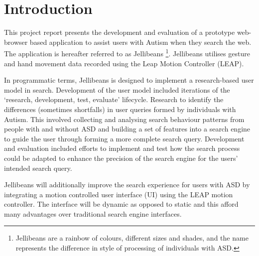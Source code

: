 \documentclass[a4paper, 11pt]{article}
\begin{document}
\section{Introduction}\label{intro}

This project report presents the development and evaluation of a prototype web-browser based application to assist users with Autism when they search the web. The application is hereafter referred to as Jellibeans \footnote{Jellibeans are a rainbow of colours, different sizes and shades, and the name represents the difference in style of processing of individuals with ASD.}. Jellibeans utilises gesture and hand movement data recorded using the Leap Motion Controller (LEAP). 


In programmatic terms, Jellibeans is designed to implement a research-based user model in search. Development of the user model included iterations of the `research, development, test, evaluate' lifecycle. Research to identify the differences (sometimes shortfalls) in user queries formed by individuals with Autism. This involved collecting and analysing search behaviour patterns from people with and without ASD and building a set of features into a search engine to guide the user through forming a more complete search query. Development and evaluation included efforts to implement and test how the search process could be adapted to enhance the precision of the search engine for the users' intended search query. 


Jellibeans will additionally improve the search experience for users with ASD by integrating a motion controlled user interface (UI) using the LEAP motion controller. The interface will be dynamic as opposed to static and this afford many advantages over traditional search engine interfaces.
\end{document}

